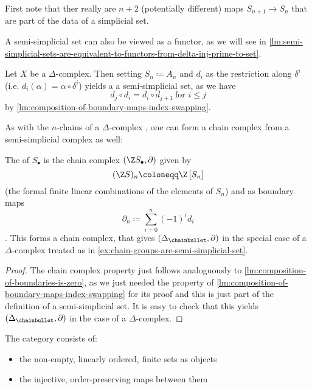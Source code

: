 \begin{oral}
    First note that ther really are $n+2$ (potentially different) maps  $S_{n+1} \to  S_n$ that are part of the data of a simplicial set.
\end{oral}

\begin{remark*}
    A semi-simplicial set can also be viewed as a functor, as we will see in \autoref{lm:semi-simplicial-sets-are-equivalent-to-functors-from-delta-inj-prime-to-set}.
\end{remark*}

\begin{example}\label{ex:chain-groups-are-semi-simplicial-set}
Let $X $ be a $\Delta$-complex. Then setting $S_n \coloneqq A_n$ and $d_i$ as the restriction along $\delta^i$ (i.e. $d_i(\alpha) = \alpha \circ \delta^i$) yields a a semi-simplicial set, as we have
    \[
    d_j \circ d_i = d_i \circ d_{j+1} ~ \text{for } i \le j
    \] 
    by \autoref{lm:composition-of-boundary-maps-index-swapping}.
\end{example}

As with the $n$-chains of a  $\Delta$-complex , one can form a chain complex from a semi-simplicial complex as well:

\begin{lemmadef}\label{def:linearization}
    The  of $S_\bullet$ is the chain complex $(\Z S_{\bullet}, \partial)$ given by
    \[
        (\Z S)_n \coloneqq \Z \left[ S_n \right] 
    \] 
    (the formal finite linear combinations of the elements of $S_n$)
    and as boundary maps
    \[
        \partial_n \coloneqq \sum_{i=0}^{n} (-1)^i d_i
    \].
    This forms a chain complex, that gives $(\Delta_{\chainbullet}, \partial)$ in the special case of a $\Delta$-complex treated as in \autoref{ex:chain-groups-are-semi-simplicial-set}.
\end{lemmadef}
\begin{proof}
    The chain complex property just follows analoguously to \autoref{lm:composition-of-boundaries-is-zero}, as we just needed the property of \autoref{lm:composition-of-boundary-maps-index-swapping} for its proof and this is just part of the definition of a semi-simplicial set. It is easy to check that this yields $(\Delta_{\chainbullet},\partial)$ in the case of a $\Delta$-complex.
\end{proof}

\begin{definition}[category of ]\label{def:delta-inj-category}
    The category  consists of:
        \begin{itemize}
            \item the non-empty, linearly ordered, finite sets as objects
            \item the injective, order-preserving maps between them
        \end{itemize}
\end{definition}

